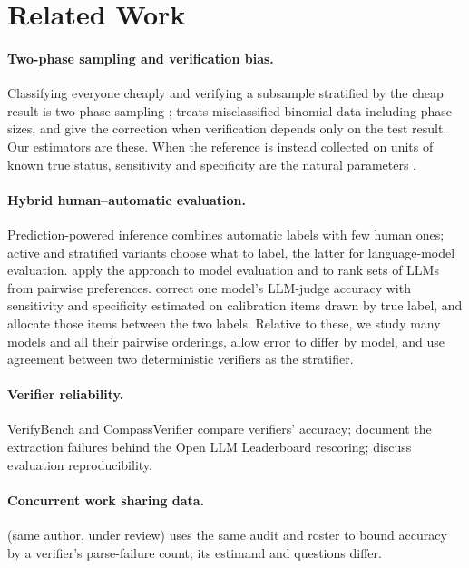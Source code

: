 \section{Related Work}
\label{sec:related-work}

\paragraph{Two-phase sampling and verification bias.} Classifying everyone
cheaply and verifying a subsample stratified by the cheap result is
two-phase sampling \citep{neyman1938contribution}; \citet{tenenbein1970double}
treats misclassified binomial data including phase sizes, and
\citet{begg1983assessment} give the correction when verification depends only
on the test result. Our estimators are these. When the reference is instead
collected on units of known true status, sensitivity and specificity are the
natural parameters \citep{lang2014confidence}.

\paragraph{Hybrid human--automatic evaluation.} Prediction-powered inference
\citep{angelopoulos2023ppi} combines automatic labels with few human ones;
active \citep{zrnic2024active} and stratified \citep{fisch2024stratified}
variants choose what to label, the latter for language-model evaluation.
\citet{boyeau2025autoeval} apply the approach to model evaluation and
\citet{chatzi2024ranking} to rank sets of LLMs from pairwise preferences.
\citet{lee2026judge} correct one model's LLM-judge accuracy with sensitivity
and specificity estimated on calibration items drawn by true label, and
allocate those items between the two labels. Relative to these, we study
many models and all their pairwise orderings, allow error to differ by
model, and use agreement between two deterministic verifiers as the
stratifier.

\paragraph{Verifier reliability.} VerifyBench \citep{li2025verifybench} and
CompassVerifier \citep{liu2025compassverifier} compare verifiers' accuracy;
\citet{kydlicek2025fixing} document the extraction failures behind the Open
LLM Leaderboard \citep{fourrier2024openllm} rescoring;
\citet{biderman2024lessons} discuss evaluation reproducibility.

\paragraph{Concurrent work sharing data.} \citet{pall2026identified} (same
author, under review) uses the same audit and roster to bound accuracy by a
verifier's parse-failure count; its estimand and questions differ.
